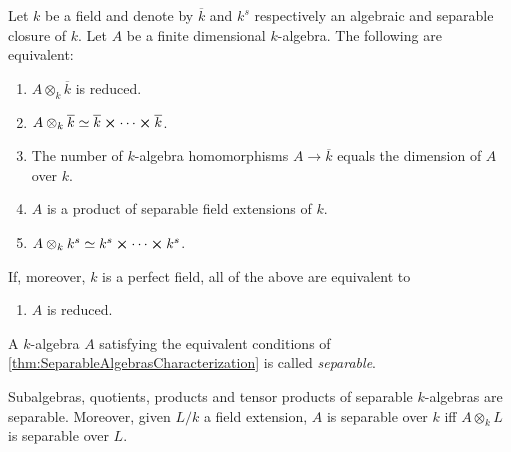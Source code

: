 \documentclass[../Main]{subfiles}
\begin{document}
\begin{thm}
	\label{thm:SeparableAlgebrasCharacterization}
	Let $k$ be a field and denote by $\overline{k}$ and $k^s$ respectively
	an algebraic and separable closure of $k$.
	Let $A$ be a finite dimensional $k$-algebra.
	The following are equivalent:
\begin{enumerate}
	\item $A \otimes_k \overline{k}$ is reduced.
	\item $A \otimes_k \overline{k} \simeq \overline{k} \cross \cdots \cross \overline{k}$.
	\item The number of $k$-algebra homomorphisms $A \to  \overline{k}$
		equals the dimension of $A$ over $k$.
	\item $A$ is a product of separable field extensions of $k$.
	\item $A \otimes_k k^s \simeq k^s \cross \cdots \cross k^s$.
\end{enumerate}
If, moreover, $k$ is a perfect field, all of the above are equivalent to
\begin{enumerate}[resume]
	\item $A$ is reduced.
\end{enumerate}
\end{thm}


\begin{defn}
	A $k$-algebra $A$ satisfying the equivalent conditions of
	\cref{thm:SeparableAlgebrasCharacterization}
	is called {\em separable}.
\end{defn}


\begin{cor}
	Subalgebras, quotients, products and tensor products of separable $k$-algebras
	are separable.
	Moreover, given $L/k$ a field extension, $A$ is separable over $k$
	iff $A \otimes_k L$ is separable over $L$.
\end{cor} 
\end{document}
